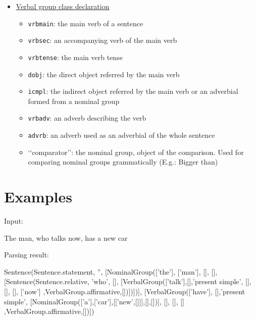 \documentclass[twoside,a4paper,10pt]{report}
\begin{document}
\begin{itemize}
    \item  \underline{Verbal group class declaration}
\begin{itemize}
    \item  \texttt{vrb{\textunderscore}main}: the main verb of a sentence
    \item  \texttt{vrb{\textunderscore}sec}: an accompanying verb of the main verb
    \item  \texttt{vrb{\textunderscore}tense}: the main verb tense
    \item  \texttt{d{\textunderscore}obj}: the direct object referred by the main verb
    \item  \texttt{i{\textunderscore}cmpl}: the indirect object referred by the main verb or an adverbial formed from a nominal group
    \item  \texttt{vrb{\textunderscore}adv}: an adverb describing the verb
    \item  \texttt{advrb}: an adverb used as an adverbial of the whole sentence
    \item  ‘‘comparator’’: {the nominal group, object of the comparison}. Used for comparing nominal groups grammatically (E.g.: Bigger than)
\end{itemize}

\end{itemize}

\section{Examples}
\label{bfebe34154a0dfd9fc7b447fc9ed74e9}%
Input:


\small
\begin{verbatimtab}
The man, who talks now, has a new car
\end{verbatimtab}
\normalsize

Parsing result:


\small
\begin{verbatimtab}
  Sentence(Sentence.statement, '', 
      [NominalGroup(['the'], ['man'], [], [],[Sentence(Sentence.relative, 'who', 
          [],  
          [VerbalGroup(['talk'],[],'present simple', 
              [], 
              [],
              [], ['now'] ,VerbalGroup.affirmative,[])])])],  
      [VerbalGroup(['have'], [],'present simple', 
          [NominalGroup(['a'],['car'],[['new',[]]],[],[])],
          [],
          [], [] ,VerbalGroup.affirmative,[])])
\end{verbatimtab}
\normalsize
\end{document}

